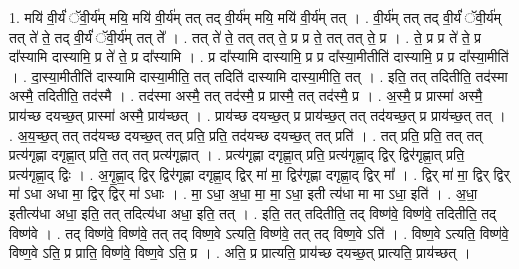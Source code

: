 \documentclass[17pt]{extarticle}
\begin{document}
1. मयि॑ वी॒र्यं॑ ॅवी॒र्य॑म् मयि॒ मयि॑ वी॒र्य॑म् तत् तद् वी॒र्य॑म् मयि॒ मयि॑ वी॒र्य॑म् तत् । . वी॒र्य॑म् तत् तद् वी॒र्यं॑ ॅवी॒र्य॑म् तत् ते॑ ते॒ तद् वी॒र्यं॑ ॅवी॒र्य॑म् तत् ते᳚ । . तत् ते॑ ते॒ तत् तत् ते॒ प्र प्र ते॒ तत् तत् ते॒ प्र । . ते॒ प्र प्र ते॑ ते॒ प्र दा᳚स्यामि दास्यामि॒ प्र ते॑ ते॒ प्र दा᳚स्यामि । . प्र दा᳚स्यामि दास्यामि॒ प्र प्र दा᳚स्या॒मीतीति॑ दास्यामि॒ प्र प्र दा᳚स्या॒मीति॑ । . दा॒स्या॒मीतीति॑ दास्यामि दास्या॒मीति॒ तत् तदिति॑ दास्यामि दास्या॒मीति॒ तत् । . इति॒ तत् तदितीति॒ तद॑स्मा अस्मै॒ तदितीति॒ तद॑स्मै । . तद॑स्मा अस्मै॒ तत् तद॑स्मै॒ प्र प्रास्मै॒ तत् तद॑स्मै॒ प्र । . अ॒स्मै॒ प्र प्रास्मा॑ अस्मै॒ प्राय॑च्छ दयच्छ॒त् प्रास्मा॑ अस्मै॒ प्राय॑च्छत् । . प्राय॑च्छ दयच्छ॒त् प्र प्राय॑च्छ॒त् तत् तद॑यच्छ॒त् प्र प्राय॑च्छ॒त् तत् । . अ॒य॒च्छ॒त् तत् तद॑यच्छ दयच्छ॒त् तत् प्रति॒ प्रति॒ तद॑यच्छ दयच्छ॒त् तत् प्रति॑ । . तत् प्रति॒ प्रति॒ तत् तत् प्रत्य॑गृह्णा दगृह्णा॒त् प्रति॒ तत् तत् प्रत्य॑गृह्णात् । . प्रत्य॑गृह्णा दगृह्णा॒त् प्रति॒ प्रत्य॑गृह्णा॒द् द्विर् द्विर॑गृह्णा॒त् प्रति॒ प्रत्य॑गृह्णा॒द् द्विः । . अ॒गृ॒ह्णा॒द् द्विर् द्विर॑गृह्णा दगृह्णा॒द् द्विर् मा॑ मा॒ द्विर॑गृह्णा दगृह्णा॒द् द्विर् मा᳚ । . द्विर् मा॑ मा॒ द्विर् द्विर् मा॑ ऽधा अधा मा॒ द्विर् द्विर् मा॑ ऽधाः । . मा॒ ऽधा॒ अ॒धा॒ मा॒ मा॒ ऽधा॒ इती त्य॑धा मा मा ऽधा॒ इति॑ । . अ॒धा॒ इतीत्य॑धा अधा॒ इति॒ तत् तदित्य॑धा अधा॒ इति॒ तत् । . इति॒ तत् तदितीति॒ तद् विष्ण॑वे॒ विष्ण॑वे॒ तदितीति॒ तद् विष्ण॑वे । . तद् विष्ण॑वे॒ विष्ण॑वे॒ तत् तद् विष्ण॒वे ऽत्यति॒ विष्ण॑वे॒ तत् तद् विष्ण॒वे ऽति॑ । . विष्ण॒वे ऽत्यति॒ विष्ण॑वे॒ विष्ण॒वे ऽति॒ प्र प्राति॒ विष्ण॑वे॒ विष्ण॒वे ऽति॒ प्र । . अति॒ प्र प्रात्यति॒ प्राय॑च्छ दयच्छ॒त् प्रात्यति॒ प्राय॑च्छत् । \newline
\end{document}
